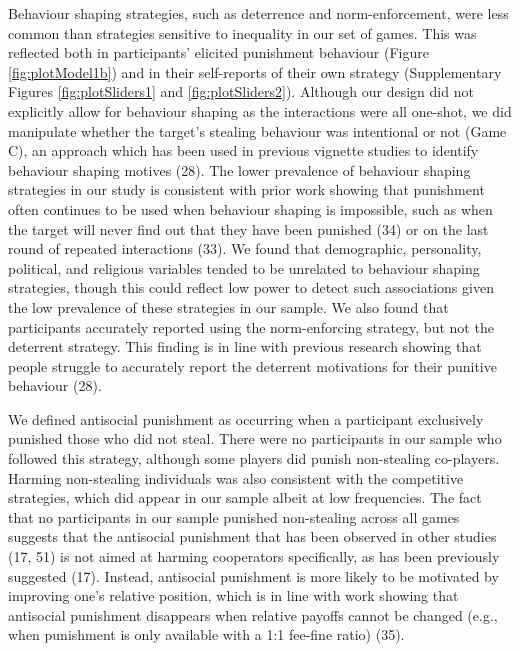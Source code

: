 \documentclass[
  english,
  man, donotrepeattitle,floatsintext]{apa6}
\begin{document}
Behaviour shaping strategies, such as deterrence and norm-enforcement, were less
common than strategies sensitive to inequality in our set of games. This was
reflected both in participants' elicited punishment behaviour (Figure
\ref{fig:plotModel1b}) and in their self-reports of their own strategy
(Supplementary Figures \ref{fig:plotSliders1} and \ref{fig:plotSliders2}).
Although our design did not explicitly allow for behaviour shaping as the
interactions were all one-shot, we did manipulate whether the target's stealing
behaviour was intentional or not (Game C), an approach which has been used in
previous vignette studies to identify behaviour shaping motives (28).
The lower prevalence of behaviour shaping strategies in our study is consistent
with prior work showing that punishment often continues to be used when
behaviour shaping is impossible, such as when the target will never find out
that they have been punished (34) or on the last round of repeated
interactions (33). We found that demographic, personality, political,
and religious variables tended to be unrelated to behaviour shaping strategies,
though this could reflect low power to detect such associations given the low
prevalence of these strategies in our sample. We also found that participants
accurately reported using the norm-enforcing strategy, but not the deterrent
strategy. This finding is in line with previous research showing that people
struggle to accurately report the deterrent motivations for their punitive
behaviour (28).

We defined antisocial punishment as occurring when a participant exclusively
punished those who did not steal. There were no participants in our sample who
followed this strategy, although some players did punish non-stealing
co-players. Harming non-stealing individuals was also consistent with the
competitive strategies, which did appear in our sample albeit at low frequencies.
The fact that no participants in our sample punished non-stealing across all
games suggests that the antisocial punishment that has been observed in other
studies (17, 51) is not aimed at harming cooperators
specifically, as has been previously suggested (17). Instead,
antisocial punishment is more likely to be motivated by improving one's
relative position, which is in line with work showing that antisocial punishment
disappears when relative payoffs cannot be changed (e.g., when punishment is
only available with a 1:1 fee-fine ratio) (35).
\end{document}
